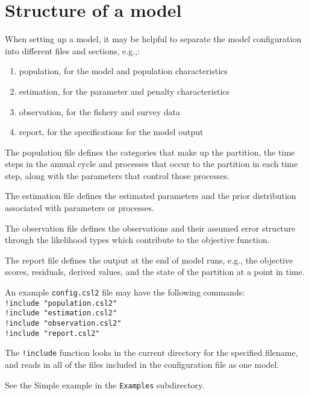 \section{Structure of a model}\label{Sec:model}

When setting up a model, it may be helpful to separate the model configuration into different files and sections, e.g.,:

\begin{enumerate}
\item population, for the model and population characteristics
\item estimation, for the parameter and penalty characteristics
\item observation, for the fishery and survey data
\item report, for the specifications for the model output
\end{enumerate}

The population file defines the categories that make up the partition, the time steps in the annual cycle and processes that occur to the partition in each time step, along with the parameters that control those processes.

The estimation file defines the estimated parameters and the prior distribution associated with parameters or processes.

The observation file defines the observations and their assumed error structure through the likelihood types which contribute to the objective function.

The report file defines the output at the end of model runs, e.g., the objective scores, residuals, derived values, and the state of the partition at a point in time.

An example \texttt{config.csl2} file may have the following commands:\\
\texttt{!include "population.csl2"}\\
\texttt{!include "estimation.csl2"}\\
\texttt{!include "observation.csl2"}\\
\texttt{!include "report.csl2"}

The \texttt{!include} function looks in the current directory for the specified filename, and reads in all of the files included in the configuration file as one model.

See the Simple example in the \texttt{Examples} subdirectory.
